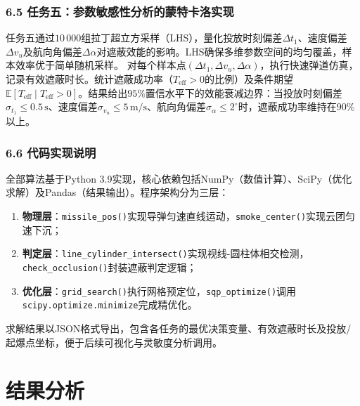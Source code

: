 \documentclass{JXUSTmodeling}
\begin{document}
\subsubsection{6.5 任务五：参数敏感性分析的蒙特卡洛实现}
任务五通过$10\,000$组拉丁超立方采样（LHS），量化投放时刻偏差$\Delta t_1$、速度偏差$\Delta v_u$及航向角偏差$\Delta\alpha$对遮蔽效能的影响。LHS确保多维参数空间的均匀覆盖，样本效率优于简单随机采样。
对每个样本点$(\Delta t_1,\Delta v_u,\Delta\alpha)$，执行快速弹道仿真，记录有效遮蔽时长。统计遮蔽成功率（$T_{\text{eff}}>0$的比例）及条件期望$\mathbb{E}[T_{\text{eff}}\mid T_{\text{eff}}>0]$。结果给出$95\%$置信水平下的效能衰减边界：当投放时刻偏差$\sigma_{t_1}\leq0.5\,\mathrm{s}$、速度偏差$\sigma_{v_u}\leq5\,\mathrm{m/s}$、航向角偏差$\sigma_\alpha\leq2^\circ$时，遮蔽成功率维持在$90\%$以上。
\subsubsection{6.6 代码实现说明}
全部算法基于Python 3.9实现，核心依赖包括NumPy（数值计算）、SciPy（优化求解）及Pandas（结果输出）。程序架构分为三层：
\begin{enumerate}
  \item \textbf{物理层}：\texttt{missile\_pos()}实现导弹匀速直线运动，\texttt{smoke\_center()}实现云团匀速下沉；
  \item \textbf{判定层}：\texttt{line\_cylinder\_intersect()}实现视线-圆柱体相交检测，\texttt{check\_occlusion()}封装遮蔽判定逻辑；
  \item \textbf{优化层}：\texttt{grid\_search()}执行网格预定位，\texttt{sqp\_optimize()}调用\texttt{scipy.optimize.minimize}完成精优化。
\end{enumerate}
求解结果以JSON格式导出，包含各任务的最优决策变量、有效遮蔽时长及投放/起爆点坐标，便于后续可视化与灵敏度分析调用。
\section{结果分析}
\end{document}
